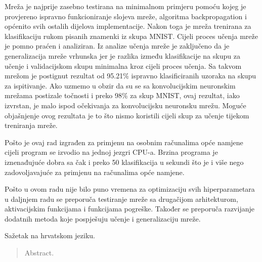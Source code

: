 \documentclass[times, utf8, zavrsni, numeric]{fer}
\begin{document}
Mreža je najprije zasebno testirana na minimalnom primjeru pomoću kojeg je provjereno ispravno funkcioniranje slojeva mreže, algoritma backpropagation i općenito svih ostalih dijelova implementacije. Nakon toga je mreža trenirana za klasifikaciju rukom pisanih znamenki iz skupa MNIST. Cijeli proces učenja mreže je pomno praćen i analiziran. Iz analize učenja mreže je zaključeno da je generalizacija mreže vrhunska jer je razlika između klasifikacije na skupu za učenje i validacijskom skupu minimalna kroz cijeli proces učenja. Sa takvom mrežom je postignut rezultat od 95.21\% ispravno klasificiranih uzoraka na skupu za ispitivanje. Ako uzmemo u obzir da su se sa konvolucijskim neuronskim mrežama postizale točnosti i preko 98\% za skup MNIST, ovaj rezultat, iako izvrstan, je malo ispod očekivanja za konvolucijsku neuronsku mrežu. Moguće objašnjenje ovog rezultata je to što nismo koristili cijeli skup za učenje tijekom treniranja mreže.

Pošto je ovaj rad izgrađen za primjenu na osobnim računalima opće namjene cijeli program se izvodio na jednoj jezgri CPU-a. Brzina programa je iznenađujuće dobra sa čak i preko 50 klasifikacija u sekundi što je i više nego zadovoljavajuće za primjenu na računalima opće namjene.

Pošto u ovom radu nije bilo puno vremena za optimizaciju svih hiperparametara u daljnjem radu se preporuča testiranje mreže sa drugačijom arhitekturom, aktivacijskim funkcijama i funkcijama pogreške. Također se preporuča razvijanje dodatnih metoda koje pospješuju učenje i generalizaciju mreže.




\begin{sazetak}
Sažetak na hrvatskom jeziku.

\end{sazetak}

\begin{abstract}
Abstract.

\end{abstract}
\end{document}
